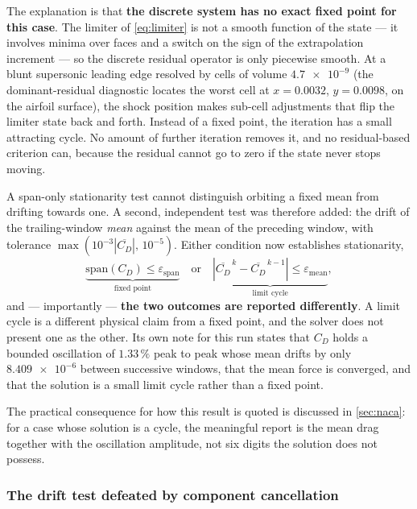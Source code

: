 The explanation is that \textbf{the discrete system has no exact fixed point for
this case}. The limiter of \cref{eq:limiter} is not a smooth function of the
state --- it involves minima over faces and a switch on the sign of the
extrapolation increment --- so the discrete residual operator is only piecewise
smooth. At a blunt supersonic leading edge resolved by cells of volume
$\num{4.7e-9}$ (the dominant-residual diagnostic locates the worst cell at
$x=\num{0.0032}$, $y=\num{0.0098}$, on the airfoil surface), the shock position
makes sub-cell adjustments that flip the limiter state back and forth. Instead of
a fixed point, the iteration has a small attracting cycle. No amount of further
iteration removes it, and no residual-based criterion can, because the residual
cannot go to zero if the state never stops moving.

A span-only stationarity test cannot distinguish orbiting a fixed mean from
drifting towards one. A second, independent test was therefore added: the drift of
the trailing-window \emph{mean} against the mean of the preceding window, with
tolerance $\max\!\left(10^{-3}|\overline{C_D}|,\,10^{-5}\right)$. Either condition
now establishes stationarity,
\begin{equation}
  \underbrace{\mathrm{span}(C_D)\le\varepsilon_{\mathrm{span}}}_{\text{fixed point}}
  \quad\text{or}\quad
  \underbrace{\left|\overline{C_D}^{\,k}-\overline{C_D}^{\,k-1}\right|
  \le\varepsilon_{\mathrm{mean}}}_{\text{limit cycle}},
  \label{eq:stationarity3}
\end{equation}
and --- importantly --- \textbf{the two outcomes are reported differently}. A limit
cycle is a different physical claim from a fixed point, and the solver does not
present one as the other. Its own note for this run states that $C_D$ holds a
bounded oscillation of $1.33\,\%$ peak to peak whose mean drifts by only
$\num{8.409e-6}$ between successive windows, that the mean force is converged, and
that the solution is a small limit cycle rather than a fixed point.

The practical consequence for how this result is quoted is discussed in
\cref{sec:naca}: for a case whose solution is a cycle, the meaningful report is the
mean drag together with the oscillation amplitude, not six digits the solution does
not possess.

\subsubsection{The drift test defeated by component cancellation}
\label{sec:cancellation}

